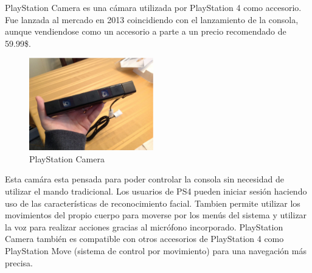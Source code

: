 


PlayStation Camera es una cámara utilizada por PlayStation 4 como accesorio. Fue
lanzada al mercado en 2013 coincidiendo con el lanzamiento de la consola, aunque
vendiendose como un accesorio a parte a un precio recomendado de 59.99\$.

\begin{figure}
  \vspace{-20pt}
  \begin{center}
    \includegraphics[width=0.48\textwidth]{images/cap3/PlaystationCamera.eps}
  \end{center}
  \vspace{-20pt}
  \caption{PlayStation Camera}
  \vspace{-10pt}
  \label{fig:PlayStation-Camera}
\end{figure}

Esta camára esta pensada para poder controlar la consola sin necesidad de
utilizar el mando tradicional. Los usuarios de PS4 pueden iniciar sesión
haciendo uso de las características de reconocimiento facial. Tambien permite
utilizar los movimientos del propio cuerpo para moverse por los menús del
sistema y utilizar la voz para realizar acciones gracias al micrófono
incorporado. PlayStation Camera también es compatible con otros accesorios de
PlayStation 4 como PlayStation Move (sistema de control por movimiento) para una
navegación más precisa.

